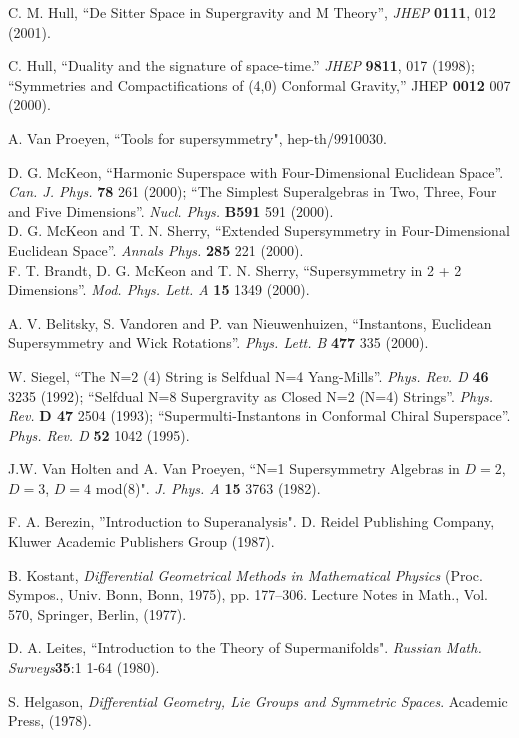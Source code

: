 \documentclass[a4paper,12pt]{article}
\begin{document}
\begin{thebibliography}{99}
C. M. Hull, ``De Sitter Space in Supergravity and M Theory'', {\it
JHEP} {\bf 0111}, 012 (2001).





   C. Hull, ``Duality and the signature of space-time.''
{\it JHEP} {\bf 9811}, 017 (1998); ``Symmetries and
Compactifications of (4,0) Conformal Gravity,'' JHEP {\bf 0012}
007 (2000).

 A. Van Proeyen, ``Tools for supersymmetry", hep-th/9910030.




D. G. McKeon, ``Harmonic Superspace with Four-Dimensional
Euclidean Space''. {\it  Can.  J.  Phys.} {\bf 78} 261 (2000);
``The Simplest Superalgebras in Two, Three, Four and Five
Dimensions''. {\it  Nucl.  Phys.} {\bf B591} 591 (2000).\\ D. G.
McKeon and T. N. Sherry, ``Extended Supersymmetry in
Four-Dimensional Euclidean Space''.  {\it Annals Phys.}  {\bf 285}
221 (2000). \\F. T. Brandt, D. G. McKeon and T. N. Sherry,
``Supersymmetry in 2 + 2 Dimensions''. {\it  Mod.  Phys.  Lett. A}
{\bf 15} 1349 (2000).

 A. V. Belitsky, S. Vandoren and P. van Nieuwenhuizen,
``Instantons, Euclidean Supersymmetry and Wick Rotations''. {\it
Phys.  Lett. B} {\bf 477} 335 (2000).

 W. Siegel,
``The N=2 (4) String is Selfdual N=4 Yang-Mills''. {\it Phys. Rev.
D } {\bf 46} 3235 (1992); ``Selfdual N=8 Supergravity as Closed
N=2 (N=4) Strings''. {\it Phys.  Rev. } {\bf D 47} 2504 (1993);
``Supermulti-Instantons in Conformal Chiral Superspace''. {\it
Phys.  Rev. D} {\bf  52} 1042 (1995).



 J.W. Van Holten and  A. Van Proeyen,
``N=1 Supersymmetry Algebras in $D = 2$, $D = 3$, $D = 4$ mod(8)".
{\it J. Phys. A} {\bf  15} 3763 (1982).

 F. A. Berezin, ''Introduction to Superanalysis". D.
Reidel Publishing Company, Kluwer Academic Publishers Group
(1987).

 B. Kostant, {\it Differential Geometrical Methods in Mathematical Physics} (Proc.
Sympos., Univ. Bonn, Bonn, 1975), pp. 177--306. Lecture Notes in
Math., Vol. 570, Springer, Berlin, (1977).


 D. A. Leites, ``Introduction to the Theory of
Supermanifolds". {\it Russian Math. Surveys}{\bf 35}:1 1-64
(1980).

 S. Helgason, {\it Differential Geometry, Lie Groups and Symmetric Spaces}.
Academic Press, (1978).




\end{thebibliography}
\end{document}
